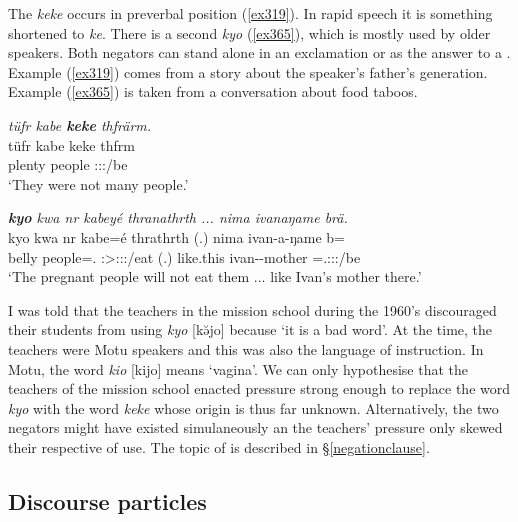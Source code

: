 The  \emph{keke} occurs in preverbal position (\ref{ex319}). In rapid speech it is something shortened to \emph{ke}. There is a second  \emph{kyo} (\ref{ex365}), which is mostly used by older speakers. Both negators can stand alone in an exclamation or as the answer to a . Example (\ref{ex319}) comes from a story about the speaker's father's generation. Example (\ref{ex365}) is taken from a conversation about food taboos.

\begin{exe}
	\ex \emph{tüfr kabe \textbf{keke} thfrärm.}\\
	\gll tüfr kabe keke thfrm\\
	plenty people \Neg{} \Stpl:\Sbj:\Pst:\Dur/be\\
	\trans `They were not many people.'
	\label{ex319}
\end{exe}
\begin{exe}
	\ex \emph{\textbf{kyo} kwa nr kabeyé thranathrth ... nima ivanaŋame brä.}\\
	\gll kyo kwa nr kabe=é thrathrth (.) nima ivan-a-ŋame b=\\
	\Neg{} \Fut{} belly people=\Erg.\Nsg{} \Stpl:\Sbj>\Stpl:\Obj:\Irr:\Ipfv/eat (.) like.this ivan-\Poss-mother \Med=\Tsg.\F:\Sbj:\Nonpast:\Ipfv/be\\
	\trans `The pregnant people will not eat them ... like Ivan's mother there.'\\
	\label{ex365}
\end{exe}

I was told that the teachers in the mission school during the 1960's discouraged their students from using \emph{kyo} [kə̆jo] because `it is a bad word'. At the time, the teachers were Motu speakers and this was also the language of instruction. In Motu, the word \emph{kio} [kijo] means `vagina'. We can only hypothesise that the teachers of the mission school enacted pressure strong enough to replace the word \emph{kyo} with the word \emph{keke} whose origin is thus far unknown. Alternatively, the two negators might have existed simulaneously an the teachers' pressure only skewed their respective  of use. The topic of  is described in \S\ref{negationclause}.

\subsection{Discourse particles} \label{discourse-particles}

